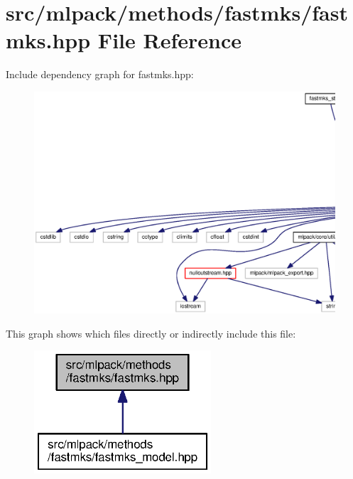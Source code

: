 \section{src/mlpack/methods/fastmks/fastmks.hpp File Reference}
\label{fastmks_8hpp}
Include dependency graph for fastmks.\+hpp\+:
\nopagebreak
\begin{figure}[H]
\begin{center}
\leavevmode
\includegraphics[width=350pt]{fastmks_8hpp__incl}
\end{center}
\end{figure}
This graph shows which files directly or indirectly include this file\+:
\nopagebreak
\begin{figure}[H]
\begin{center}
\leavevmode
\includegraphics[width=187pt]{fastmks_8hpp__dep__incl}
\end{center}
\end{figure}
